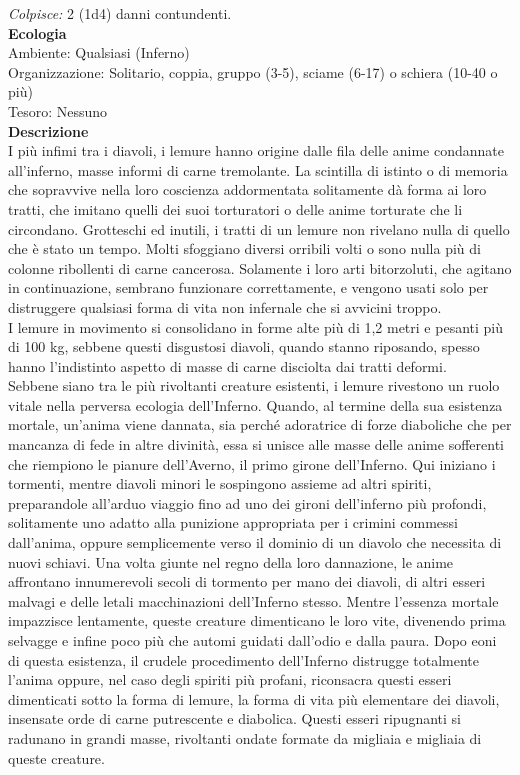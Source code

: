 \begin{multicols}{2}
\emph{Colpisce:} 2 (1d4) danni contundenti.\\
\textbf{Ecologia}\\
Ambiente: Qualsiasi (Inferno)\\
Organizzazione: Solitario, coppia, gruppo (3-5), sciame (6-17) o schiera (10-40 o più)\\
Tesoro: Nessuno\\
\textbf{Descrizione}\\
I più infimi tra i diavoli, i lemure hanno origine dalle fila delle anime condannate all'inferno, masse informi di carne tremolante. La scintilla di istinto o di memoria che sopravvive nella loro coscienza addormentata solitamente dà forma ai loro tratti, che imitano quelli dei suoi torturatori o delle anime torturate che li circondano. Grotteschi ed inutili, i tratti di un lemure non rivelano nulla di quello che è stato un tempo. Molti sfoggiano diversi orribili volti o sono nulla più di colonne ribollenti di carne cancerosa. Solamente i loro arti bitorzoluti, che agitano in continuazione, sembrano funzionare correttamente, e vengono usati solo per distruggere qualsiasi forma di vita non infernale che si avvicini troppo.\\
I lemure in movimento si consolidano in forme alte più di 1,2 metri e pesanti più di 100 kg, sebbene questi disgustosi diavoli, quando stanno riposando, spesso hanno l'indistinto aspetto di masse di carne disciolta dai tratti deformi.\\

Sebbene siano tra le più rivoltanti creature esistenti, i lemure rivestono un ruolo vitale nella perversa ecologia dell'Inferno. Quando, al termine della sua esistenza mortale, un'anima viene dannata, sia perché adoratrice di forze diaboliche che per mancanza di fede in altre divinità, essa si unisce alle masse delle anime sofferenti che riempiono le pianure dell'Averno, il primo girone dell'Inferno. Qui iniziano i tormenti, mentre diavoli minori le sospingono assieme ad altri spiriti, preparandole all'arduo viaggio fino ad uno dei gironi dell'inferno più profondi, solitamente uno adatto alla punizione appropriata per i crimini commessi dall'anima, oppure semplicemente verso il dominio di un diavolo che necessita di nuovi schiavi. Una volta giunte nel regno della loro dannazione, le anime affrontano innumerevoli secoli di tormento per mano dei diavoli, di altri esseri malvagi e delle letali macchinazioni dell'Inferno stesso. Mentre l'essenza mortale impazzisce lentamente, queste creature dimenticano le loro vite, divenendo prima selvagge e infine poco più che automi guidati dall'odio e dalla paura. Dopo eoni di questa esistenza, il crudele procedimento dell'Inferno distrugge totalmente l'anima oppure, nel caso degli spiriti più profani, riconsacra questi esseri dimenticati sotto la forma di lemure, la forma di vita più elementare dei diavoli, insensate orde di carne putrescente e diabolica. Questi esseri ripugnanti si radunano in grandi masse, rivoltanti ondate formate da migliaia e migliaia di queste creature.\\


\end{multicols}
